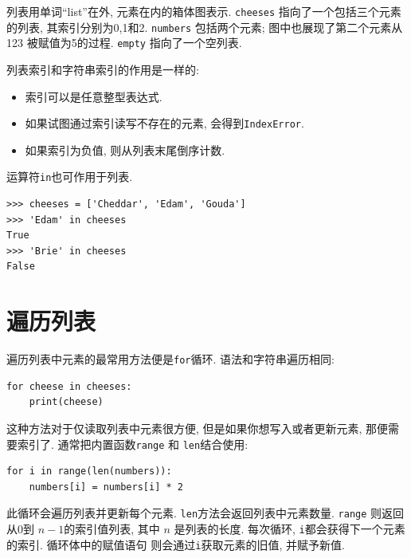 \documentclass[10pt]{book}
\begin{document}
列表用单词``list''在外, 元素在内的箱体图表示. 
{\tt cheeses} 指向了一个包括三个元素的列表, 其索引分别为0,1和2. 
{\tt numbers} 包括两个元素; 图中也展现了第二个元素从123 被赋值为5的过程. 
{\tt empty} 指向了一个空列表. 

列表索引和字符串索引的作用是一样的:

\begin{itemize}

\item 索引可以是任意整型表达式.

\item 如果试图通过索引读写不存在的元素, 会得到{\tt IndexError}.

\item 如果索引为负值, 则从列表末尾倒序计数. 

\end{itemize}


运算符{\tt in}也可作用于列表. 

\begin{verbatim}
>>> cheeses = ['Cheddar', 'Edam', 'Gouda']
>>> 'Edam' in cheeses
True
>>> 'Brie' in cheeses
False
\end{verbatim}


\section{遍历列表}

遍历列表中元素的最常用方法便是{\tt for}循环. 语法和字符串遍历相同:

\begin{verbatim}
for cheese in cheeses:
    print(cheese)
\end{verbatim}
%
这种方法对于仅读取列表中元素很方便, 但是如果你想写入或者更新元素, 
那便需要索引了. 
通常把内置函数{\tt range} 和 {\tt len}结合使用:

\begin{verbatim}
for i in range(len(numbers)):
    numbers[i] = numbers[i] * 2
\end{verbatim}
%

此循环会遍历列表并更新每个元素. 
{\tt len}方法会返回列表中元素数量. {\tt range} 则返回从0到 $n-1$的索引值列表, 
其中 $n$ 是列表的长度. 
每次循环, {\tt i}都会获得下一个元素的索引. 循环体中的赋值语句
则会通过{\tt i}获取元素的旧值, 并赋予新值. 
\end{document}
